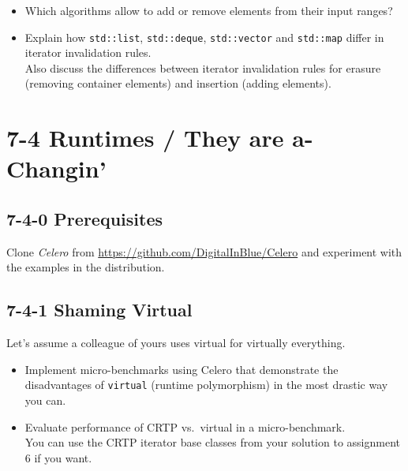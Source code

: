 \documentclass[]{article}
\providecommand{\tightlist}{%
  \setlength{\itemsep}{0pt}\setlength{\parskip}{0pt}}
\begin{document}
\begin{itemize}
\tightlist
\item
  Which algorithms allow to add or remove elements from their input
  ranges?
\item
  Explain how \texttt{std::list}, \texttt{std::deque},
  \texttt{std::vector} and \texttt{std::map} differ in iterator
  invalidation rules.\\
   Also discuss the differences between iterator invalidation rules for
  erasure (removing container elements) and insertion (adding elements).
\end{itemize}

\section{7-4 Runtimes / They are
a-Changin'}\label{runtimes-they-are-a-changin}

\subsection{7-4-0 Prerequisites}\label{prerequisites}

Clone \emph{Celero} from \url{https://github.com/DigitalInBlue/Celero}
and experiment with the examples in the distribution.

\subsection{7-4-1 Shaming Virtual}\label{shaming-virtual}

Let's assume a colleague of yours uses virtual for virtually everything.

\begin{itemize}
\item
  Implement micro-benchmarks using Celero that demonstrate the
  disadvantages of \texttt{virtual} (runtime polymorphism) in the most
  drastic way you can.
\item
  Evaluate performance of CRTP vs.~virtual in a micro-benchmark.\\
   You can use the CRTP iterator base classes from your solution to
  assignment 6 if you want.
\end{itemize}
\end{document}
